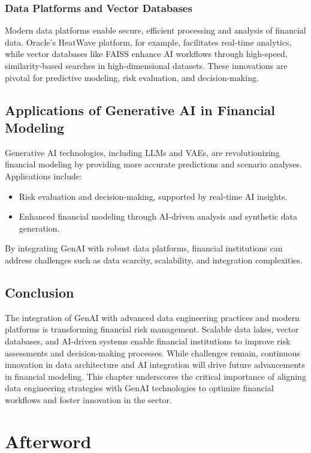 \documentclass[a4paper,headinclude=on,footinclude=on,12pt,oneside]{scrbook}
\begin{document}
\subsection{Data Platforms and Vector Databases}
Modern data platforms enable secure, efficient processing and analysis of financial data. Oracle's HeatWave platform, for example, facilitates real-time analytics, while vector databases like FAISS enhance AI workflows through high-speed, similarity-based searches in high-dimensional datasets. These innovations are pivotal for predictive modeling, risk evaluation, and decision-making.

\section{Applications of Generative AI in Financial Modeling}
Generative AI technologies, including LLMs and VAEs, are revolutionizing financial modeling by providing more accurate predictions and scenario analyses. Applications include:
\begin{itemize}
	\item Risk evaluation and decision-making, supported by real-time AI insights.
	\item Enhanced financial modeling through AI-driven analysis and synthetic data generation.
\end{itemize}
By integrating GenAI with robust data platforms, financial institutions can address challenges such as data scarcity, scalability, and integration complexities.

\section{Conclusion}
The integration of GenAI with advanced data engineering practices and modern platforms is transforming financial risk management. Scalable data lakes, vector databases, and AI-driven systems enable financial institutions to improve risk assessments and decision-making processes. While challenges remain, continuous innovation in data architecture and AI integration will drive future advancements in financial modeling. This chapter underscores the critical importance of aligning data engineering strategies with GenAI technologies to optimize financial workflows and foster innovation in the sector.







\chapter*{Afterword}
\end{document}
